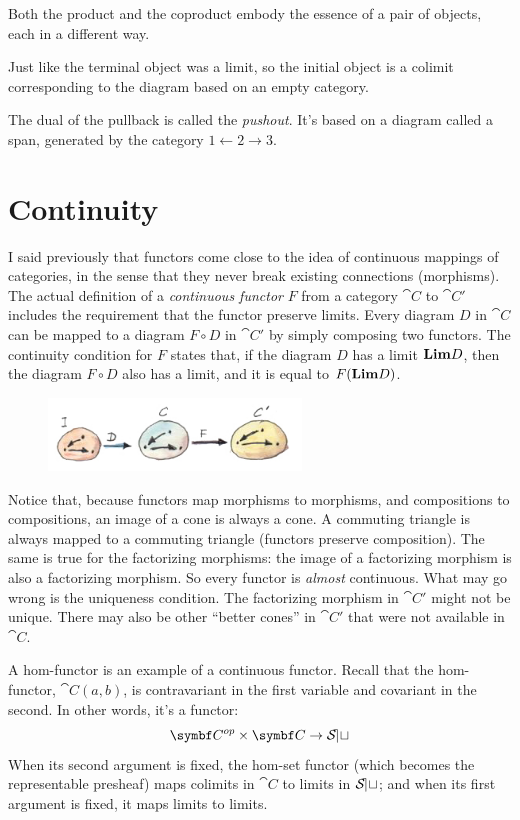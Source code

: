 \noindent
Both the product and the coproduct embody the essence of a pair of
objects, each in a different way.

Just like the terminal object was a limit, so the initial object is a
colimit corresponding to the diagram based on an empty category.

The dual of the pullback is called the \emph{pushout}. It's based on a
diagram called a span, generated by the category
$1\leftarrow2\rightarrow3$.

\section{Continuity}

I said previously that functors come close to the idea of continuous
mappings of categories, in the sense that they never break existing
connections (morphisms). The actual definition of a \emph{continuous
functor} $F$ from a category $\cat{C}$ to $\cat{C'}$ includes the
requirement that the functor preserve limits. Every diagram $D$
in $\cat{C}$ can be mapped to a diagram $F \circ D$ in $\cat{C'}$ by
simply composing two functors. The continuity condition for $F$
states that, if the diagram $D$ has a limit $\Lim[D]$, then
the diagram $F \circ D$ also has a limit, and it is equal to
$F (\Lim[D])$.

\begin{figure}[H]
\centering
\includegraphics[width=0.6\textwidth]{images/continuity.jpg}
\end{figure}

\noindent
Notice that, because functors map morphisms to morphisms, and
compositions to compositions, an image of a cone is always a cone. A
commuting triangle is always mapped to a commuting triangle (functors
preserve composition). The same is true for the factorizing morphisms:
the image of a factorizing morphism is also a factorizing morphism. So
every functor is \emph{almost} continuous. What may go wrong is the
uniqueness condition. The factorizing morphism in $\cat{C'}$ might not be
unique. There may also be other ``better cones'' in $\cat{C'}$ that were
not available in $\cat{C}$.

A hom-functor is an example of a continuous functor. Recall that the
hom-functor, $\cat{C}(a, b)$, is contravariant in the first variable
and covariant in the second. In other words, it's a functor:
\[\cat{C}^{op} \times \cat{C} \to \Set\]
When its second argument is fixed, the hom-set functor (which becomes
the representable presheaf) maps colimits in $\cat{C}$ to limits in
$\Set$; and when its first argument is fixed, it maps limits to
limits.

